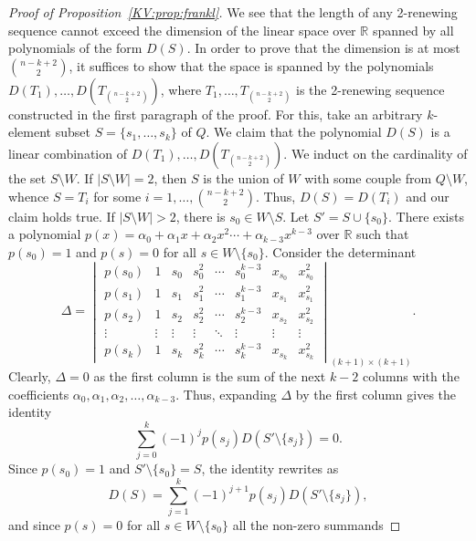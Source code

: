 \documentclass{irmaart}
\theoremstyle{plain}
\begin{document}
\begin{proof}[Proof of Proposition~\ref{KV:prop:frankl}]
We see that the length of any 2-renewing sequence cannot exceed the dimension
of the linear space over $\mathbb{R}$ spanned by all polynomials of the form
$D(S)$. In order to prove that the dimension is at most $\binom{n-k+2}2$, it
suffices to show that the space is spanned by the polynomials
$D(T_1),\dots,D(T_{\binom{n-k+2}2})$, where $T_1,\dots,T_{\binom{n-k+2}2}$ is
the 2-renewing sequence constructed in the first paragraph of the proof. For
this, take an arbitrary $k$-element subset $S=\{s_1,\dots,s_k\}$ of $Q$. We
claim that the polynomial $D(S)$ is a linear combination of
$D(T_1),\dots,D(T_{\binom{n-k+2}2})$. We induct on the cardinality of the set
$S\setminus W$. If $|S\setminus W|=2$, then $S$ is the union of $W$ with some
couple from $Q\setminus W$, whence $S=T_i$ for some $i=1,\dots,\binom{n-k+2}2$.
Thus, $D(S)=D(T_i)$ and our claim holds true. If $|S\setminus W|>2$, there is
$s_0\in W\setminus S$. Let $S'=S\cup\{s_0\}$. There exists a polynomial
$p(x)=\alpha_0+\alpha_1x+\alpha_2x^2\cdots+\alpha_{k-3}x^{k-3}$ over
$\mathbb{R}$ such that $p(s_0)=1$ and $p(s)=0$ for all $s\in
W\setminus\{s_0\}$. Consider the determinant
\begin{displaymath}
\Delta=\begin{vmatrix}
p(s_0) & 1 & s_0 & s_0^2 & \cdots & s_0^{k-3} & x_{s_0} & x_{s_0}^2\\
p(s_1) & 1 & s_1 & s_1^2 & \cdots & s_1^{k-3} & x_{s_1} & x_{s_1}^2\\
p(s_2) & 1 & s_2 & s_2^2 & \cdots & s_2^{k-3} & x_{s_2} & x_{s_2}^2\\
\vdots & \vdots & \vdots & \vdots & \ddots & \vdots & \vdots & \vdots\\
p(s_k) & 1 & s_k & s_k^2 & \cdots & s_k^{k-3} & x_{s_k} & x_{s_k}^2
\end{vmatrix}_{(k+1)\times (k+1)}.
\end{displaymath}
Clearly, $\Delta=0$ as the first column is the sum of the next $k-2$ columns
with the coefficients $\alpha_0,\alpha_1,\alpha_2,\dots,\alpha_{k-3}$. Thus,
expanding $\Delta$ by the first column gives the identity
\begin{displaymath}
\sum_{j=0}^{k}(-1)^jp(s_j)D(S'\setminus\{s_j\})=0.
\end{displaymath}
Since $p(s_0)=1$ and $S'\setminus\{s_0\}=S$, the identity rewrites as
\begin{equation}
\label{KV:eq:combination}
D(S)=\sum_{j=1}^{k}(-1)^{j+1}p(s_j)D(S'\setminus\{s_j\}),
\end{equation}
and since $p(s)=0$ for all $s\in W\setminus\{s_0\}$ all the non-zero summands

\end{proof}
\end{document}
